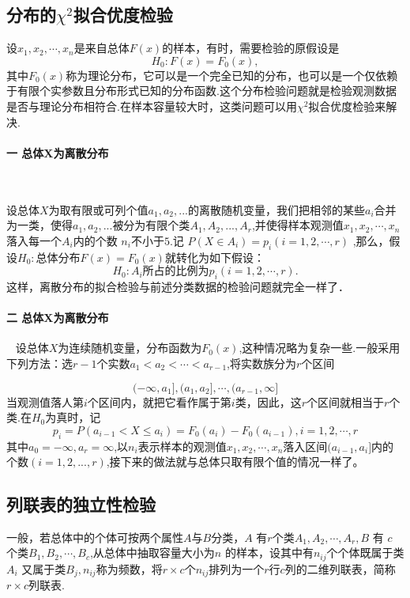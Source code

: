 \subsection{分布的\texorpdfstring{$ \chi^2$}{χ2}拟合优度检验}
设$x_1,x_2,\cdots,x_n$是来自总体$F(x)$的样本，有时，需要检验的原假设是
$$
    H_{0}:F(x)=F_{0}(x),
$$
其中$F_0(x)$称为理论分布，它可以是一个完全已知的分布，也可以是一个仅依赖于有限个实参数且分布形式已知的分布函数.这个分布检验问题就是检验观测数据是否与理论分布相符合.在样本容量较大时，这类问题可以用$ \chi^2$拟合优度检验来解决.

\paragraph{一 总体X为离散分布}~{}

设总体$X$为取有限或可列个值$a_1,a_2,...$的离散随机变量，我们把相邻的某些$a_i$合并为一类，使得$a_1,a_2,...$被分为有限个类$A_1,A_2,...,A_r$,并使得样本观测值$x_1 ,x_2,\cdots,x_n$落入每一个$A_i$内的个数 $n_i$不小于$5$.记 $P(X\in A_i)=p_i(i=1,2,\cdots,r)$ ,那么，假设$H_{0}:$总体分布$F(x)=F_{0}(x)$就转化为如下假设：
$$
    H_{0}:A_{i}\text{所占的比例为}p_{i}(i=1,2,\cdots,r).
$$
这样，离散分布的拟合检验与前述分类数据的检验问题就完全一样了．

\paragraph{二 总体X为离散分布}~{}
设总体$X$为连续随机变量，分布函数为$F_0(x)$,这种情况略为复杂一些.一般采用下列方法：选$r-1$个实数$a_1<a_2<\cdots<a_{r-1}$,将实数族分为$r$个区间

$$
    (-\infty,a_1],(a_1,a_2],\cdots,(a_{r-1},\infty]
$$
当观测值落人第$i$个区间内，就把它看作属于第$i$类，因此，这$r$个区间就相当于$r$个类.在$H_{0}$为真时，记
$$
    p_i = P(a_{i-1} < X \leq a_i) = F_0(a_i)-F_0(a_{i-1}) ,i=1,2,\cdots,r
$$
其中$a_0=-\infty,a_r=\infty$,以$n_i$表示样本的观测值$x_1,x_2,\cdots,x_n$落入区间$(a_{i-1},a_i]$内的个数$(i=1,2,...,r)$,接下来的做法就与总体只取有限个值的情况一样了。
\subsection{列联表的独立性检验}
一般，若总体中的个体可按两个属性$A$与$B$分类，$A$ 有$r$个类$A_1,A_2,\cdots,A_r,B$ 有 $c$ 个类$B_1,B_2,\cdots,B_{c}$,从总体中抽取容量大小为$n$ 的样本，设其中有$n_{ij}$个个体既属于类$A_i$ 又属于类$B_j,n_{ij}$称为频数，将$r\times c$个$ n_{ij}$排列为一个$r$行$c$列的二维列联表，简称$r\times c$列联表.


